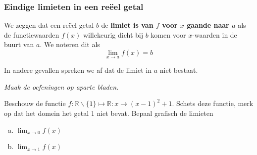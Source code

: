 \documentclass[12pt]{article}
\newenvironment{definitie}
{
  \vspace{0.4cm}
  \begin{mdframed}[nobreak=true,frametitle={Definitie}]
  }{%
  \end{mdframed}
}
\begin{document}
\subsubsection*{Eindige limieten in een reëel getal}
\begin{definitie}
  We zeggen dat een reëel getal $b$ de {\bf limiet is van $f$ voor $x$ gaande naar $a$} als de functiewaarden $f(x)$ willekeurig dicht bij $b$ komen voor $x$-waarden in de buurt van $a$. We noteren dit als
  $$\lim_{x\to a} f(x)=b$$
\end{definitie}

In andere gevallen spreken we af dat de limiet in $a$ niet bestaat.

{\em Maak de oefeningen op aparte bladen.}

\begin{oefening}
  Beschouw de functie $f:\mathbb{R}\backslash\{1\}\mapsto\mathbb{R}:x\to (x-1)^2+1$. Schets deze functie, merk op dat het domein het getal $1$ niet bevat. Bepaal grafisch de limieten
  \begin{enumerate}[(a)]
  \item $\displaystyle\lim_{x\to0} f(x)$
  \item $\displaystyle\lim_{x\to1} f(x)$
  \end{enumerate}
\end{oefening}
\end{document}

